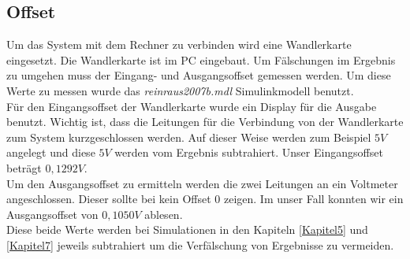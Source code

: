 \subsection{Offset}
Um das System mit dem Rechner zu verbinden wird eine Wandlerkarte eingesetzt. Die Wandlerkarte ist im PC eingebaut. Um Fälschungen im Ergebnis zu umgehen muss der Eingang- und Ausgangsoffset gemessen werden. Um diese Werte zu messen wurde das \textit{reinraus2007b.mdl} Simulinkmodell benutzt.\\

Für den Eingangsoffset der Wandlerkarte wurde ein Display für die Ausgabe benutzt. Wichtig ist, dass die Leitungen für die Verbindung von der Wandlerkarte zum System kurzgeschlossen werden. Auf dieser Weise werden zum Beispiel $5V$ angelegt und diese $5V$ werden vom Ergebnis subtrahiert. Unser Eingangsoffset beträgt $0,1292V$.\\

Um den Ausgangsoffset zu ermitteln werden die zwei Leitungen an ein Voltmeter angeschlossen. Dieser sollte bei kein Offset $0$ zeigen. Im unser Fall konnten wir ein Ausgangsoffset von $0,1050V$ ablesen.\\

Diese beide Werte werden bei Simulationen in den Kapiteln \ref{Kapitel5} und \ref{Kapitel7} jeweils  subtrahiert um die Verfälschung von Ergebnisse zu vermeiden.



